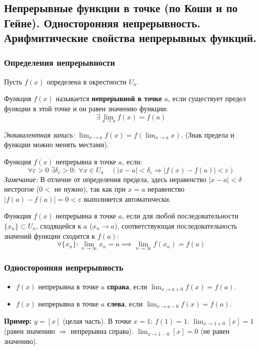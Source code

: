 \subsection{Непрерывные функции в точке (по Коши и по Гейне). Односторонняя непрерывность. Арифмитические свойства непрерывных функций.}

\subsubsection*{Определения непрерывности}

Пусть $f(x)$ определена в окрестности $U_a$.

\begin{tcolorbox}[title=Определение (через пределы)]
	Функция $f(x)$ называется \textbf{непрерывной в точке} $a$, если существует предел функции в этой точке и он равен значению функции:
	\[ \exists \lim_{x\to a} f(x) = f(a) \]
	
	\textit{Эквивалентная запись:} $\lim_{x\to a} f(x) = f(\lim_{x\to a} x)$. (Знак предела и функции можно менять местами).
\end{tcolorbox}

\begin{tcolorbox}[title=Определение по Коши ($\varepsilon - \delta$)]
	Функция $f(x)$ непрерывна в точке $a$, если:
	\[ \forall \varepsilon > 0\; \exists \delta_\varepsilon > 0:\; \forall x \in U_a \quad (|x - a| < \delta_\varepsilon \Rightarrow |f(x) - f(a)| < \varepsilon) \]
	\textit{Замечание:} В отличие от определения предела, здесь неравенство $|x-a| < \delta$ нестрогое ($0 <$ не нужно), так как при $x=a$ неравенство $|f(a)-f(a)|=0 < \varepsilon$ выполняется автоматически.
\end{tcolorbox}

\begin{tcolorbox}[title=Определение по Гейне (на языке последовательностей)]
	Функция $f(x)$ непрерывна в точке $a$, если для любой последовательности $\{x_n\} \subset U_a$, сходящейся к $a$ ($x_n \to a$), соответствующая последовательность значений функции сходится к $f(a)$:
	\[ \forall \{x_n\}: \lim_{n\to\infty} x_n = a \implies \lim_{n\to\infty} f(x_n) = f(a) \]
\end{tcolorbox}

\subsubsection*{Односторонняя непрерывность}

\begin{tcolorbox}
	\begin{itemize}
		\item $f(x)$ непрерывна в точке $a$ \textbf{справа}, если $\lim_{x\to a + 0} f(x) = f(a)$.
		\item $f(x)$ непрерывна в точке $a$ \textbf{слева}, если $\lim_{x\to a - 0} f(x) = f(a)$.
	\end{itemize}
\end{tcolorbox}
\textbf{Пример:} $y = [x]$ (целая часть).
В точке $x=1$: $f(1) = 1$.
$\lim_{x\to 1+0} [x] = 1$ (равен значению $\Rightarrow$ непрерывна справа).
$\lim_{x\to 1-0} [x] = 0$ (не равен значению).

